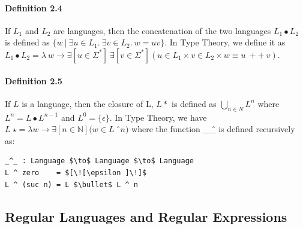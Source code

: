 \documentclass[twoside,openright,final]{bhamthesis}
\begin{document}
\paragraph{Definition 2.4} If \(L_1\) and \(L_2\) are languages, then
the concatenation of the two languages \(L_1\bullet L_2\) is defined
as \(\{w\  |\  \exists u\in L_1.\ \exists v\in L_2.\ w = uv\}\). In
Type Theory, we define it as \(L_1\bullet L_2 = \lambda\ w \to \exists[
u \in \Sigma^* ]\ \exists[ v \in \Sigma^* ] ( u \in L_1 \times v \in L_2 \times w \equiv u\ ++\ v ) \).

\paragraph{Definition 2.5} If \(L\) is a language, then the closure of
L, \(L\ast\) is defined as \( \bigcup_{n \in N} L^n \) where
\( L^n = L\bullet L^{n - 1} \) and \(L^0 = \{\epsilon\}\). In Type
Theory, we have \(L\ \star = \lambda w \to \exists [ n \in \mathbb{N}
]( w \in L\ \)\^\ \(n)\) where the function \_\^ \_ is defined
recursively as: 
\begin{lstlisting}[mathescape=true,xleftmargin=.3\textwidth,aboveskip=0pt,belowskip=0pt]
_^_ : Language $\to$ Language $\to$ Language
L ^ zero    = $[\![\epsilon ]\!]$
L ^ (suc n) = L $\bullet$ L ^ n
\end{lstlisting}

\subsection{Regular Languages and Regular Expressions}
\end{document}
